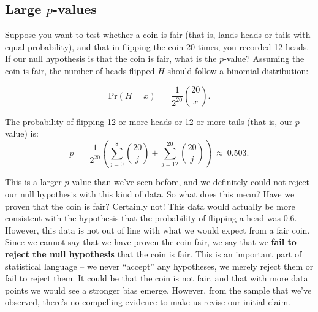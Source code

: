 
\subsection{Large $p$-values}



Suppose you want to test whether a coin is fair (that is, lands heads or tails with equal probability), and that in flipping the coin 20 times, you recorded 12 heads.  If our null hypothesis is that the coin is fair, what is the $p$-value? Assuming the coin is fair, the number of heads flipped $H$ should follow a binomial distribution:

\begin{equation*}

\textrm{Pr}(H=x)\ = \ \frac{1}{2^{20}}{20 \choose x}.

\end{equation*}

The probability of flipping 12 or more heads or 12 or more tails (that is, our $p$-value) is:$$

p\ = \ \frac{1}{2^{20}}\left(\sum_{j=0}^{8}{20 \choose j}+\sum_{j=12}^{20}{20 \choose j}\right)\ \approx \ 0.503.$$



This is a larger $p$-value than we've seen before, and we definitely could not reject our null hypothesis with this kind of data.  So what does this mean? Have we proven that the coin is fair? Certainly not! This data would actually be more consistent with the hypothesis that the probability of flipping a head was 0.6. However, this data is not out of line with what we would expect from a fair coin. Since we cannot say that we have proven the coin fair, we say that we \textbf{fail to reject the null hypothesis} that the coin is fair. This is an important part of statistical language -- we never ``accept'' any hypotheses, we merely reject them or fail to reject them. It could be that the coin is not fair, and that with more data points we would see a stronger bias emerge. However, from the sample that we've observed, there's no compelling evidence to make us revise our initial claim.










